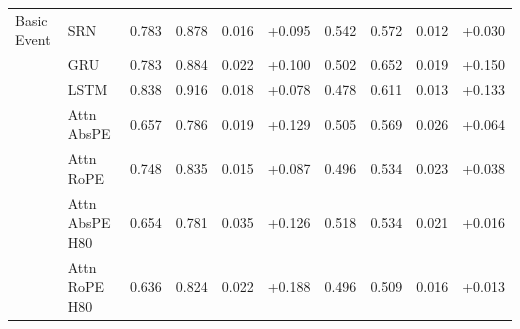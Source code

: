 \begin{longtable}{@{}llrrrrrrrr@{}}
\addlinespace
Basic Event & SRN & 0.783 & 0.878 & 0.016 & +0.095 & 0.542 & 0.572 & 0.012 & +0.030 \\
 & GRU & 0.783 & 0.884 & 0.022 & +0.100 & 0.502 & 0.652 & 0.019 & +0.150 \\
 & LSTM & 0.838 & 0.916 & 0.018 & +0.078 & 0.478 & 0.611 & 0.013 & +0.133 \\
 & Attn AbsPE & 0.657 & 0.786 & 0.019 & +0.129 & 0.505 & 0.569 & 0.026 & +0.064 \\
 & Attn RoPE & 0.748 & 0.835 & 0.015 & +0.087 & 0.496 & 0.534 & 0.023 & +0.038 \\
 & Attn AbsPE H80 & 0.654 & 0.781 & 0.035 & +0.126 & 0.518 & 0.534 & 0.021 & +0.016 \\
 & Attn RoPE H80 & 0.636 & 0.824 & 0.022 & +0.188 & 0.496 & 0.509 & 0.016 & +0.013 \\
\end{longtable}
\normalsize
